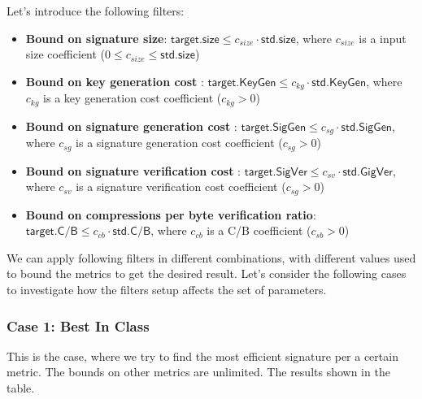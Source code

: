 Let's introduce the following filters:

\begin{itemize}
    \item \textbf{Bound on signature size}: $\mathsf{target.size}\leq c_{size} \cdot \mathsf{std.size}$, where $c_{size}$ is a input size coefficient ($0 \leq c_{size} \leq \mathsf{std.size}$)
    \item \textbf{Bound on key generation cost }: $\mathsf{target.KeyGen}\leq c_{kg} \cdot \mathsf{std.KeyGen}$, where $c_{kg}$ is a key generation cost coefficient ($c_{kg} > 0$)
    \item \textbf{Bound on signature generation cost }: $\mathsf{target.SigGen}\leq c_{sg} \cdot \mathsf{std.SigGen}$, where $c_{sg}$ is a signature generation cost coefficient ($c_{sg} > 0$)
    \item \textbf{Bound on signature verification cost }: $\mathsf{target.SigVer}\leq c_{sv} \cdot \mathsf{std.GigVer}$, where $c_{sv}$ is a signature verification cost coefficient ($c_{sg} > 0$)
    \item \textbf{Bound on compressions per byte verification ratio}: $\mathsf{target.C/B}\leq c_{cb} \cdot \mathsf{std.C/B}$, where $c_{cb}$ is a C/B coefficient  ($c_{sb} > 0$)
\end{itemize}

We can apply following filters in different combinations, with different values used to bound the metrics to get the desired result. Let's consider the following cases to investigate how the filters setup affects the set of parameters.

\subsubsection{Case 1: Best In Class}
This is the case, where we try to find the most efficient signature per a certain metric.  The bounds on other metrics are unlimited. The results shown in the table. 

